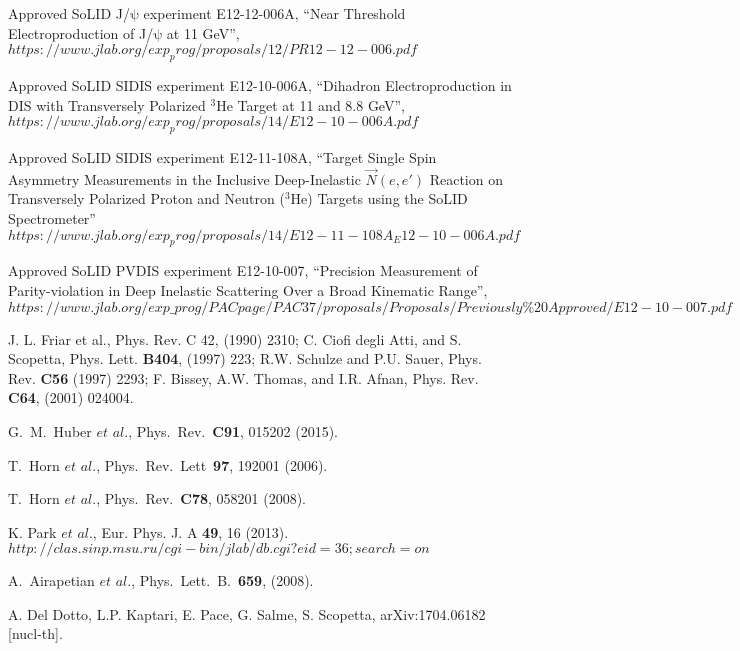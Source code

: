 \begin{thebibliography}{}
  Approved SoLID J/$\mathrm{\psi}$ experiment E12-12-006A,
  ``Near Threshold Electroproduction of J/$\mathrm{\psi}$ at 11 GeV'',\\
$https://www.jlab.org/exp_prog/proposals/12/PR12-12-006.pdf$

  Approved SoLID SIDIS experiment E12-10-006A,
  ``Dihadron Electroproduction in DIS with  Transversely Polarized
  $\mathrm{^{3}He}$ Target at 11 and 8.8 GeV'',\\
$https://www.jlab.org/exp_prog/proposals/14/E12-10-006A.pdf$

   Approved SoLID SIDIS experiment E12-11-108A,
``Target Single Spin Asymmetry Measurements in the Inclusive Deep-Inelastic
$\vec{N}(e,e')$ Reaction on Transversely Polarized Proton and Neutron
($\mathrm{^{3}He}$) Targets using the SoLID Spectrometer''\\
$https://www.jlab.org/exp_prog/proposals/14/E12-11-108A_E12-10-006A.pdf$

  Approved SoLID PVDIS experiment E12-10-007,
  ``Precision Measurement of Parity-violation in Deep Inelastic Scattering Over
  a Broad Kinematic Range'',\\
  $https://www.jlab.org/exp\_prog/PACpage/PAC37/proposals/Proposals/Previously\%20Approved/E12-10-007.pdf$

J. L. Friar et al., Phys. Rev. C 42, (1990) 2310; C. Ciofi
degli Atti, and S. Scopetta, Phys. Lett. {\bf B404}, (1997) 223; R.W. Schulze
and P.U. Sauer, Phys. Rev. {\bf C56} (1997) 2293; F. Bissey, A.W. Thomas, and
I.R. Afnan, Phys. Rev. {\bf C64}, (2001) 024004.

 G.~M.~Huber $\textit{et}$ $\textit{al}$.,
Phys.~Rev.~\textbf{C91}, 015202 (2015).

 T.~Horn $\textit{et}$ $\textit{al}$.,
Phys.~Rev.~Lett~\textbf{97}, 192001 (2006).

 T.~Horn $\textit{et}$ $\textit{al}$.,
Phys.~Rev.~\textbf{C78}, 058201 (2008).

 K. Park $\textit{et}$ $\textit{al}$.,
Eur. Phys. J. A \textbf{49}, 16 (2013).\\
$http://clas.sinp.msu.ru/cgi-bin/jlab/db.cgi?eid=36;search=on$

 A.~Airapetian $\textit{et}$ $\textit{al}$.,
Phys.~Lett.~B.~\textbf{659}, (2008).

 A. Del Dotto, L.P. Kaptari, E. Pace, G. Salme, S. Scopetta,
arXiv:1704.06182 [nucl-th].


\end{thebibliography}
